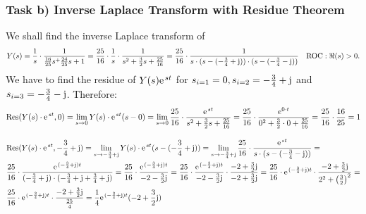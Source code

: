 \documentclass[11pt,a4paper,DIV=12]{scrartcl}
\begin{document}
\subsubsection{Task b) Inverse Laplace Transform with Residue Theorem}
We shall find the inverse Laplace transform of
\begin{align}
	Y(s) = \frac{1}{s}\cdot \frac{1}{\frac{16}{25}s^+\frac{24}{25}s+1}=\frac{25}{16}\cdot\frac{1}{s}\cdot\frac{1}{s^2+\frac{3}{2}s+\frac{25}{16}}=\frac{25}{16}\cdot\frac{1}{s\cdot(s-(-\frac{3}{4}+\im))\cdot(s-(-\frac{3}{4}-\im))}
\quad \text{ROC}: \Re(s) > 0
	. \nonumber
\end{align}
We have to find the residue of $Y(s)\e^{st}$ for $s_{i=1}=0, s_{i=2}=-\frac{3}{4}+\im$ and $s_{i=3}=-\frac{3}{4}-\im$.
%
Therefore:
%
\begin{align}
	\mathrm{Res}(Y(s)\cdot\e^{st},0)=\lim\limits_{s\rightarrow 0}Y(s)\cdot\e^{st} (s-0)=\lim\limits_{s\rightarrow0}\frac{25}{16}\cdot\frac{\e^{st}}{s^2 +\frac{3}{2}s+\frac{25}{16}}=\frac{25}{16}\cdot\frac{e^{0 \cdot t}}{0^2+\frac{3}{2}\cdot0+\frac{25}{16}}=\frac{25}{16}\cdot\frac{16}{25}=1
\end{align}

\begin{align}
&	\mathrm{Res}(Y(s)\cdot\e^{st},-\frac{3}{4}+\im)=\lim\limits_{s\rightarrow -\frac{3}{4}+\im}Y(s)\cdot\e^{st}(s-(-\frac{3}{4}+\im))=\lim\limits_{s\rightarrow -\frac{3}{4}+\im}\frac{25}{16}\cdot\frac{\e^{st}}{s\cdot(s-(-\frac{3}{4}-\im))} = \nonumber \\
&	\frac{25}{16}\cdot\frac{\e^{(-\frac{3}{4}+\im)t}}{(-\frac{3}{4}+\im)\cdot(-\frac{3}{4}+\im+\frac{3}{4}+\im)}=\frac{25}{16}\cdot\frac{\e^{(-\frac{3}{4}+\im)t}}{-2-\frac{3}{2}\im}=\frac{25}{16}\cdot\frac{\e^{(-\frac{3}{4}+\im)t}}{-2-\frac{3}{2}\im}\cdot\frac{-2+\frac{3}{2}\im}{-2+\frac{3}{2}\im}=\frac{25}{16}\cdot\e^{(-\frac{3}{4}+\im)t}\cdot\frac{-2+\frac{3}{2}\im}{2^2+\big (\frac{3}{2}\big)^2}=\nonumber \\
&	\frac{25}{16}\cdot\e^{(-\frac{3}{4}+\im)t}\cdot\frac{-2+\frac{3}{2}\im}{\frac{25}{4}}=\frac{1}{4}\e^{(-\frac{3}{4}+\im)t}(-2+\frac{3}{2}\im)
\end{align}
\end{document}
